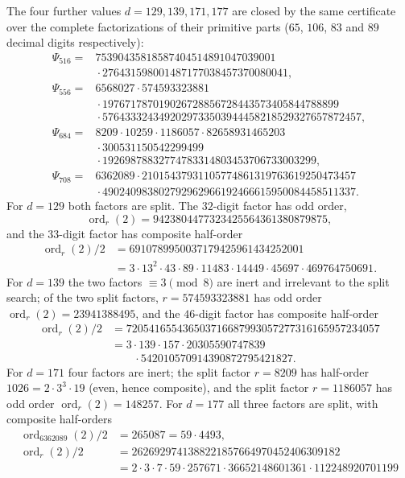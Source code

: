 \documentclass[11pt]{amsart}
\theoremstyle{plain}
\theoremstyle{definition}
\theoremstyle{remark}
\numberwithin{equation}{section}
\newcommand{\ord}{\operatorname{ord}}
\begin{document}
The four further values $d=129,139,171,177$ are closed by the same certificate over the complete factorizations of their primitive parts ($65$, $106$, $83$ and $89$ decimal digits respectively):
\[
\begin{aligned}
  \Psi_{516}={}&
  75390435818587404514891047039001\\
  &{}\cdot276431598001487177038457370080041,\\[2pt]
  \Psi_{556}={}&
  6568027\cdot574593323881\\
  &{}\cdot197671787019026728856728443573405844788899\\
  &{}\cdot5764333243492029733503944458218529327657872457,\\[2pt]
  \Psi_{684}={}&
  8209\cdot10259\cdot1186057\cdot82658931465203\\
  &{}\cdot300531150542299499\\
  &{}\cdot19269878832774783314803453706733003299,\\[2pt]
  \Psi_{708}={}&
  6362089\cdot21015437931105774861319763619250473457\\
  &{}\cdot490240983802792962966192466615950084458511337.
\end{aligned}
\]
For $d=129$ both factors are split. The $32$-digit factor has odd order,
\[
  \ord_r(2)=9423804477323425564361380879875,
\]
and the $33$-digit factor has composite half-order
\[
\begin{aligned}
  \ord_r(2)/2
  &=6910789950037179425961434252001\\
  &=3\cdot13^2\cdot43\cdot89\cdot11483\cdot14449\cdot45697\cdot469764750691.
\end{aligned}
\]
For $d=139$ the two factors $\equiv3\pmod8$ are inert and irrelevant to the split search; of the two split factors, $r=574593323881$ has odd order $\ord_r(2)=23941388495$, and the $46$-digit factor has composite half-order
\[
\begin{aligned}
  \ord_r(2)/2
  &=720541655436503716687993057277316165957234057\\
  &=3\cdot139\cdot157\cdot20305590747839\\
  &\qquad{}\cdot542010570914390872795421827.
\end{aligned}
\]
For $d=171$ four factors are inert; the split factor $r=8209$ has half-order $1026=2\cdot3^3\cdot19$ (even, hence composite), and the split factor $r=1186057$ has odd order $\ord_r(2)=148257$. For $d=177$ all three factors are split, with composite half-orders
\[
\begin{aligned}
  \ord_{6362089}(2)/2&=265087=59\cdot4493,\\
  \ord_r(2)/2&=2626929741388221857664970452406309182\\
  &=2\cdot3\cdot7\cdot59\cdot257671\cdot36652148601361\cdot112248920701199
\end{aligned}
\]
\end{document}
